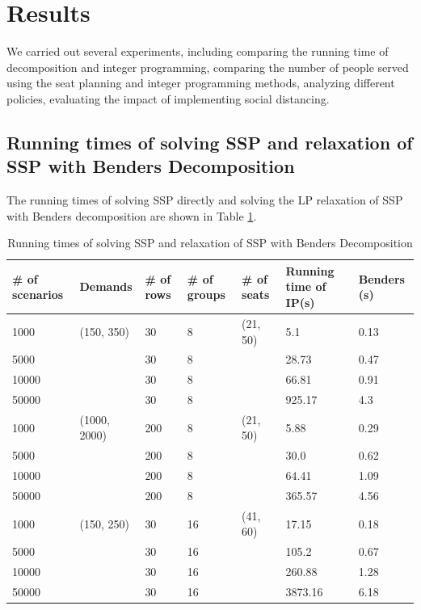 \section{Results}
We carried out several experiments, including comparing the running time of decomposition and integer programming, comparing the number of people served using the seat planning and integer programming methods, analyzing different policies, evaluating the impact of implementing social distancing.



\subsection{Running times of solving SSP and relaxation of SSP with Benders Decomposition}\label{Bender_IP}

The running times of solving SSP directly and solving the LP relaxation of SSP with Benders decomposition are shown in Table \ref{tab_1}.

\begin{table}[ht]
  \centering
  \scriptsize
  \caption{Running times of solving SSP and relaxation of SSP with Benders Decomposition}\label{tab_1}
  \begin{tabular}{|l|l|l|l|l|l|l|}
  \hline
  \# of scenarios & Demands & \# of rows & \# of groups & \# of seats & Running time of IP(s) & Benders (s) \\
  \hline
  1000  & (150, 350) & 30 & 8 & (21, 50) & 5.1  & 0.13 \\
  5000  &            & 30 & 8 &         & 28.73 & 0.47  \\
  10000 &            & 30 & 8 &         & 66.81  & 0.91 \\
  50000 &            & 30 & 8 &         & 925.17 & 4.3 \\
  \hline
  1000  & (1000, 2000) & 200 & 8 & (21, 50) & 5.88 & 0.29 \\
  5000  &              & 200 & 8 &          & 30.0 & 0.62 \\
  10000 &              & 200 & 8 &          & 64.41 & 1.09 \\
  50000 &              & 200 & 8 &          & 365.57 & 4.56\\
  \hline
  1000  & (150, 250) & 30 & 16 & (41, 60) & 17.15  & 0.18 \\
  5000  &            & 30 & 16 &          & 105.2  & 0.67 \\
  10000 &            & 30 & 16 &          & 260.88 & 1.28 \\
  50000 &            & 30 & 16 &          & 3873.16 & 6.18 \\
  \hline
  \end{tabular}
\end{table}

